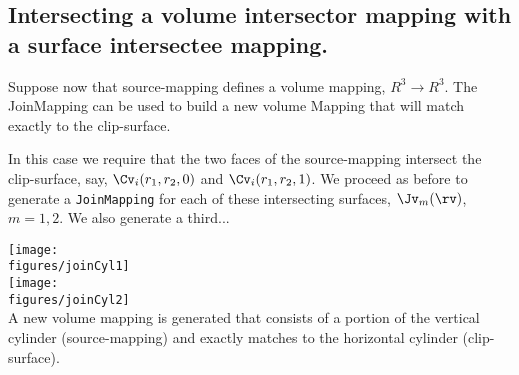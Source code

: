 \subsection{Intersecting a volume intersector mapping with a surface intersectee mapping.}

  Suppose now that source-mapping defines a volume mapping, $R^3\rightarrow R^3$.
The JoinMapping can be used to build a new volume Mapping that will match exactly to the
clip-surface. 

   In this case we require that the two faces of the source-mapping intersect the clip-surface,
say, $\Cv_i(r_1,r_2,0)$ and $\Cv_i(r_1,r_2,1)$. We proceed as before to generate a {\tt JoinMapping}
for each of these intersecting surfaces, $\Jv_m(\rv)$, $m=1,2$. We also generate a third...


\noindent
\begin{minipage}{.4\linewidth}
{\footnotesize
{}
}
\end{minipage}\hfill
\begin{minipage}{.6\linewidth}
  \begin{center}
  \texttt{[image: \\figures/joinCyl1]}\\
  \texttt{[image: \\figures/joinCyl2]}\\
  {A new volume mapping is generated that consists of a portion of the vertical cylinder (source-mapping)
   and exactly matches to the horizontal cylinder (clip-surface).}
  \end{center}
\end{minipage}





